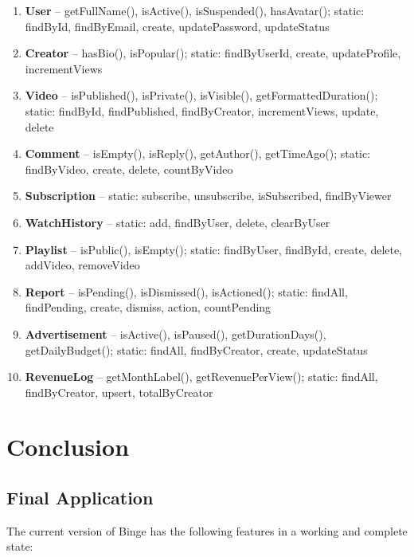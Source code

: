 \documentclass[a4paper, twoside]{article}
\begin{document}
\begin{enumerate}
    \item \textbf{User} -- getFullName(), isActive(), isSuspended(), hasAvatar(); static: findById, findByEmail, create, updatePassword, updateStatus
    \item \textbf{Creator} -- hasBio(), isPopular(); static: findByUserId, create, updateProfile, incrementViews
    \item \textbf{Video} -- isPublished(), isPrivate(), isVisible(), getFormattedDuration(); static: findById, findPublished, findByCreator, incrementViews, update, delete
    \item \textbf{Comment} -- isEmpty(), isReply(), getAuthor(), getTimeAgo(); static: findByVideo, create, delete, countByVideo
    \item \textbf{Subscription} -- static: subscribe, unsubscribe, isSubscribed, findByViewer
    \item \textbf{WatchHistory} -- static: add, findByUser, delete, clearByUser
    \item \textbf{Playlist} -- isPublic(), isEmpty(); static: findByUser, findById, create, delete, addVideo, removeVideo
    \item \textbf{Report} -- isPending(), isDismissed(), isActioned(); static: findAll, findPending, create, dismiss, action, countPending
    \item \textbf{Advertisement} -- isActive(), isPaused(), getDurationDays(), getDailyBudget(); static: findAll, findByCreator, create, updateStatus
    \item \textbf{RevenueLog} -- getMonthLabel(), getRevenuePerView(); static: findAll, findByCreator, upsert, totalByCreator
\end{enumerate}

\section{Conclusion}

\subsection{Final Application}
The current version of Binge has the following features in a working and complete state:
\end{document}
